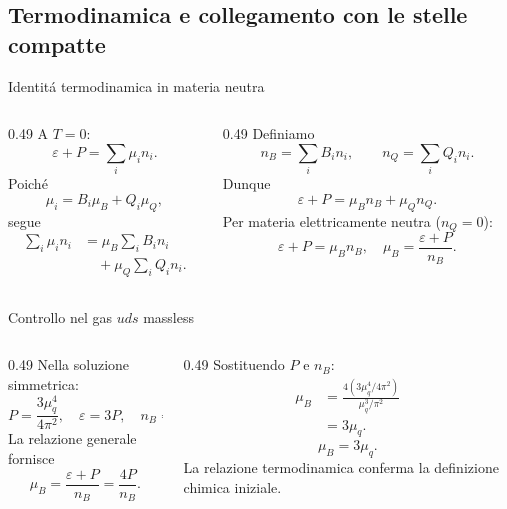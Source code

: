\subsection{Termodinamica e collegamento con le stelle compatte}

\begin{frame}[t]{Identit\'a termodinamica in materia neutra}
\small
\begin{columns}[T,onlytextwidth]
\begin{column}{0.49\textwidth}
A $T=0$:
\[
\varepsilon+P=\sum_i\mu_i n_i.
\]
Poich\'e
\[
\mu_i=B_i\mu_B+Q_i\mu_Q,
\]
segue
\[
\begin{aligned}
\sum_i\mu_i n_i
&=\mu_B\sum_iB_in_i\\
&\quad+\mu_Q\sum_iQ_in_i.
\end{aligned}
\]
\end{column}
\begin{column}{0.49\textwidth}
Definiamo
\[
n_B=\sum_iB_in_i,\qquad
n_Q=\sum_iQ_in_i.
\]
Dunque
\[
\varepsilon+P=\mu_B n_B+\mu_Q n_Q.
\]
Per materia elettricamente neutra ($n_Q=0$):
\[
\boxed{\varepsilon+P=\mu_Bn_B},
\quad
\boxed{\mu_B=\frac{\varepsilon+P}{n_B}}.
\]
\end{column}
\end{columns}
\end{frame}

\begin{frame}[t]{Controllo nel gas $uds$ massless}
\small
\begin{columns}[T,onlytextwidth]
\begin{column}{0.49\textwidth}
Nella soluzione simmetrica:
\[
P=\frac{3\mu_q^4}{4\pi^2},
\quad
\varepsilon=3P,
\quad
n_B=\frac{\mu_q^3}{\pi^2}.
\]
La relazione generale fornisce
\[
\mu_B=\frac{\varepsilon+P}{n_B}
=\frac{4P}{n_B}.
\]
\end{column}
\begin{column}{0.49\textwidth}
Sostituendo $P$ e $n_B$:
\[
\begin{aligned}
\mu_B
&=\frac{4(3\mu_q^4/4\pi^2)}
{\mu_q^3/\pi^2}\\
&=3\mu_q.
\end{aligned}
\]
\[
\boxed{\mu_B=3\mu_q}.
\]
La relazione termodinamica conferma la definizione chimica iniziale.
\end{column}
\end{columns}
\end{frame}

